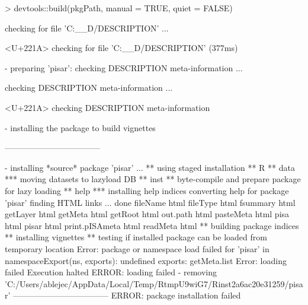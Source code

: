 \documentclass[a4paper,12pt]{article}\usepackage[]{graphicx}\usepackage[]{color}
\begin{document}
\begin{Schunk}
\begin{Sinput}
> devtools::build(pkgPath, manual = TRUE, quiet = FALSE)
\end{Sinput}
\begin{Soutput}
  
  
  
   checking for file 'C:\__D\OMIKE\pisar/DESCRIPTION' ...
  
<U+221A>  checking for file 'C:\__D\OMIKE\pisar/DESCRIPTION' (377ms)

  
  
  
-  preparing 'pisar':
   checking DESCRIPTION meta-information ...
  
   checking DESCRIPTION meta-information ... 
  
<U+221A>  checking DESCRIPTION meta-information

  
  
  
-  installing the package to build vignettes

  
         -----------------------------------

  
-  installing *source* package 'pisar' ...
   ** using staged installation
   ** R
   ** data
   *** moving datasets to lazyload DB
   ** inst
   ** byte-compile and prepare package for lazy loading
   ** help
   *** installing help indices
     converting help for package 'pisar'
       finding HTML links ... done
       fileName                                html  
       fileType                                html  
       fsummary                                html  
       getLayer                                html  
       getMeta                                 html  
       getRoot                                 html  
       out.path                                html  
       pasteMeta                               html  
       pisa                                    html  
       pisar                                   html  
       print.pISAmeta                          html  
       readMeta                                html  
   ** building package indices
   ** installing vignettes
   ** testing if installed package can be loaded from temporary location
   Error: package or namespace load failed for 'pisar' in namespaceExport(ns, exports):
    undefined exports: getMeta.list
   Error: loading failed
   Execution halted
   ERROR: loading failed
-  removing 'C:/Users/ablejec/AppData/Local/Temp/RtmpU9wiG7/Rinst2a6ac20e31259/pisar'
         -----------------------------------
   ERROR: package installation failed



\end{Soutput}
\end{Schunk}
\end{document}
